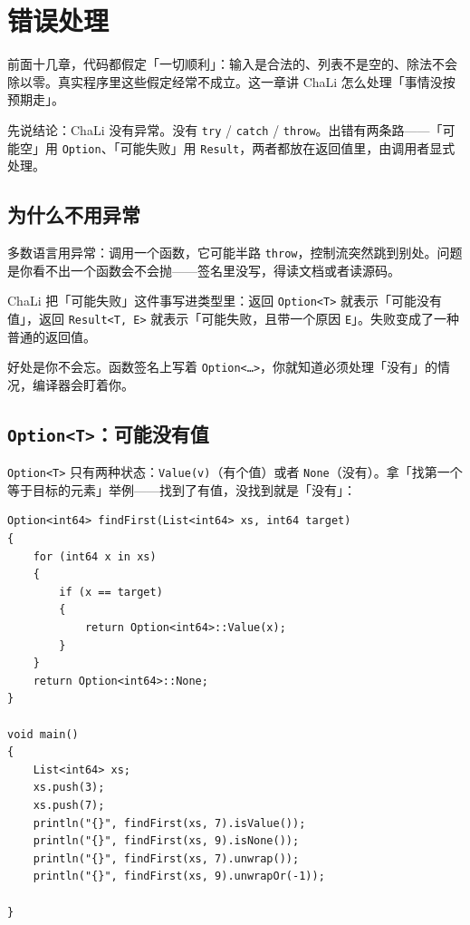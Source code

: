 \chapter{错误处理}
\label{ch:16}

前面十几章，代码都假定「一切顺利」：输入是合法的、列表不是空的、除法不会除以零。真实程序里这些假定经常不成立。这一章讲 ChaLi 怎么处理「事情没按预期走」。

先说结论：ChaLi 没有异常。没有 \texttt{try} / \texttt{catch} / \texttt{throw}。出错有两条路——「可能空」用 \texttt{Option}、「可能失败」用 \texttt{Result}，两者都放在返回值里，由调用者显式处理。

\section{为什么不用异常}

多数语言用异常：调用一个函数，它可能半路 \texttt{throw}，控制流突然跳到别处。问题是你看不出一个函数会不会抛——签名里没写，得读文档或者读源码。

ChaLi 把「可能失败」这件事写进类型里：返回 \texttt{Option<\allowbreak{}T>\allowbreak{}} 就表示「可能没有值」，返回 \texttt{Result<\allowbreak{}T,\allowbreak{} E>\allowbreak{}} 就表示「可能失败，且带一个原因 \texttt{E}」。失败变成了一种普通的返回值。

好处是你不会忘。函数签名上写着 \texttt{Option<\allowbreak{}…>\allowbreak{}}，你就知道必须处理「没有」的情况，编译器会盯着你。

\section{\texttt{Option<\allowbreak{}T>\allowbreak{}}：可能没有值}

\texttt{Option<\allowbreak{}T>\allowbreak{}} 只有两种状态：\texttt{Value(\allowbreak{}v)\allowbreak{}}（有个值）或者 \texttt{None}（没有）。拿「找第一个等于目标的元素」举例——找到了有值，没找到就是「没有」：

\par
\medskip
\begin{lstlisting}[style=chali]
Option<int64> findFirst(List<int64> xs, int64 target)
{
    for (int64 x in xs)
    {
        if (x == target)
        {
            return Option<int64>::Value(x);
        }
    }
    return Option<int64>::None;
}

void main()
{
    List<int64> xs;
    xs.push(3);
    xs.push(7);
    println("{}", findFirst(xs, 7).isValue());
    println("{}", findFirst(xs, 9).isNone());
    println("{}", findFirst(xs, 7).unwrap());
    println("{}", findFirst(xs, 9).unwrapOr(-1));

}
\end{lstlisting}
\par
\medskip

